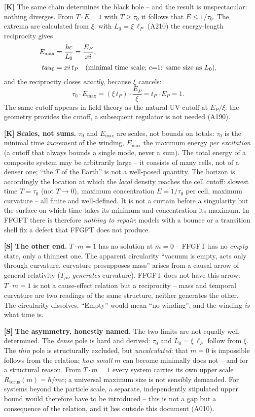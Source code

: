 \textbf{[K]} The same chain determines the black hole -- and the result is
unspectacular: nothing diverges. From $T\cdot E=1$ with $T\ge \tau_0$ it follows
that $E\le 1/\tau_0$. The extrema are calculated from $\xi$: with
$L_0=\xi\,\ell_P$ (A210) the energy-length reciprocity gives
\begin{align}
  E_\text{max} &= \frac{\hbar c}{L_0} = \frac{E_P}{\xi}, \notag\\[2pt]
  \tau_0 &= \xi\,t_P
  \quad(\text{minimal time scale; }c{=}1\text{: same size as }L_0), \notag
\end{align}
and the reciprocity closes \emph{exactly}, because $\xi$ cancels:
\[
  \tau_0\cdot E_\text{max} = (\xi\,t_P)\cdot\frac{E_P}{\xi} = t_P\cdot E_P = 1.
\]
The same cutoff appears in field theory as the natural UV cutoff at $E_P/\xi$:
the geometry provides the cutoff, a subsequent regulator is not needed (A190).

\textbf{[K]} \textbf{Scales, not sums.} $\tau_0$ and $E_\text{max}$ are scales,
not bounds on totals: $\tau_0$ is the minimal time \emph{increment} of the winding,
$E_\text{max}$ the maximum energy \emph{per excitation} (a cutoff that always
bounds a single mode, never a sum). The total energy of a composite system may
be arbitrarily large -- it consists of many cells, not of a denser one;
``the $T$ of the Earth'' is not a well-posed quantity. The horizon is accordingly
the location at which the \emph{local} density reaches the cell cutoff: slowest
time $T=\tau_0$ (not $T\to0$), maximum concentration $E=1/\tau_0$ per cell,
maximum curvature -- all finite and well-defined. It is not a curtain before a
singularity but the surface on which time takes its minimum and concentration
its maximum. In FFGFT there is therefore \emph{nothing to repair}: models with
a bounce or a transition shell fix a defect that FFGFT does not produce.

\textbf{[S]} \textbf{The other end.} $T\cdot m=1$ has no solution at $m=0$ --
FFGFT has no \emph{empty} state, only a thinnest one. The apparent circularity
``vacuum is empty, acts only through curvature, curvature presupposes mass''
arises from a causal arrow of general relativity ($T_{\mu\nu}$ \emph{generates}
curvature). FFGFT does not have this arrow: $T\cdot m=1$ is not a cause-effect
relation but a reciprocity -- mass and temporal curvature are two readings of the
same structure, neither generates the other. The circularity dissolves.
``Empty'' would mean ``no winding'', and the winding \emph{is} what time is.

\textbf{[S]} \textbf{The asymmetry, honestly named.} The two limits are not
equally well determined. The \emph{dense} pole is hard and derived: $\tau_0$ and
$L_0=\xi\,\ell_P$ follow from $\xi$. The \emph{thin} pole is structurally
excluded, but \emph{uncalculated}: that $m=0$ is impossible follows from the
relation; \emph{how small} $m$ can become minimally does not -- and for a
structural reason. From $T\cdot m=1$ every system carries its own upper scale
$R_\text{torus}(m)=\hbar/mc$; a universal maximum size is not sensibly demanded.
For systems beyond the particle scale, a separate, independently stipulated upper
bound would therefore have to be introduced -- this is not a gap but a consequence
of the relation, and it lies outside this document (A010).

